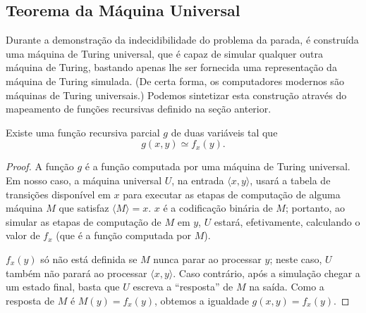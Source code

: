 \subsection{Teorema da Máquina Universal}
\label{sec:universal_turing_machine}

Durante a demonstração da indecidibilidade do problema da parada,
é construída uma máquina de Turing universal,
que é capaz de simular qualquer outra máquina de Turing,
bastando apenas lhe ser fornecida uma representação da máquina de Turing simulada.
(De certa forma,
os computadores modernos são máquinas de Turing universais.)
Podemos sintetizar esta construção através do mapeamento de funções recursivas
definido na seção anterior.

\begin{theorem}
    Existe uma função recursiva parcial $g$ de duas variáveis tal que
    \begin{equation*}
        g(x, y) \simeq f_x(y).
    \end{equation*}
\end{theorem}

\begin{proof}
    A função $g$ é a função computada por uma máquina de Turing universal.
    Em nosso caso,
    a máquina universal $U$,
    na entrada $\langle x, y \rangle$,
    usará a tabela de transições disponível em $x$
    para executar as etapas de computação de alguma máquina $M$
    que satisfaz $\langle M \rangle = x$.
    $x$ é a codificação binária de $M$;
    portanto,
    ao simular as etapas de computação de $M$ em $y$,
    $U$ estará, efetivamente,
    calculando o valor de $f_x$ (que é a função computada por $M$).

    $f_x(y)$ só não está definida se $M$ nunca parar ao processar $y$;
    neste caso, $U$ também não parará ao processar $\langle x, y \rangle$.
    Caso contrário,
    após a simulação chegar a um estado final,
    basta que $U$ escreva a ``resposta'' de $M$ na saída.
    Como a resposta de $M$ é $M(y) = f_x(y)$,
    obtemos a igualdade $g(x, y) = f_x(y)$.
\end{proof}
